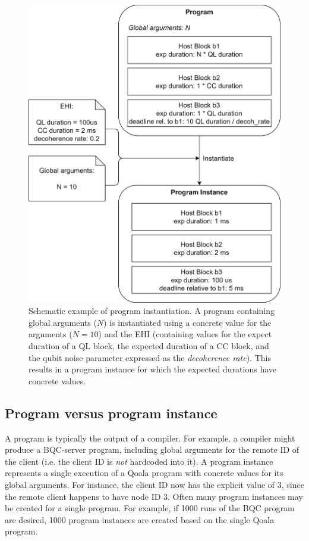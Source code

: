 \begin{figure}[ht]
    \centering
    \includegraphics[width=\columnwidth]{figures/qoala/instantiation.png}
    \caption{Schematic example of program instantiation.
    A program containing global arguments ($N$) is instantiated using a concrete value for the arguments ($N = 10$) and the EHI (containing values for the expect duration of a QL block, the expected duration of a CC block, and the qubit noise parameter expressed as the \textit{decoherence rate}). This results in a program instance for which the expected durations have concrete values.
    }
    \label{fig:app:instantiation}
\end{figure}

\subsection{Program versus program instance}
A program is typically the output of a compiler.
For example, a compiler might produce a BQC-server program, including global arguments for the remote ID of the client (i.e. the client ID is \textit{not} hardcoded into it).
A program instance represents a single execution of a Qoala program with concrete values for its global arguments.
For instance, the client ID now has the explicit value of 3, since the remote client happens to have node ID 3.
Often many program instances may be created for a single program.
For example, if 1000 runs of the BQC program are desired, 1000 program instances are created based on the single Qoala program.


